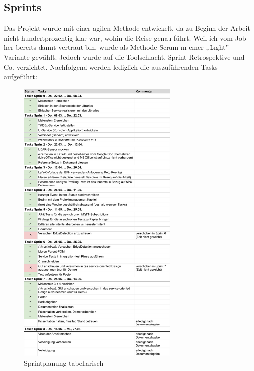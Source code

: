 \subsection{Sprints}
Das Projekt wurde mit einer agilen Methode entwickelt, da zu Beginn der Arbeit nicht hundertprozentig klar war, wohin die Reise genau führt. Weil ich vom Job her bereits damit vertraut bin, wurde als Methode  Scrum in einer ,,Light''-Variante gewählt. Jedoch wurde auf die Toolschlacht, Sprint-Retrospektive und Co. verzichtet. Nachfolgend werden lediglich die auszuführenden Tasks aufgeführt:
\begin{figure}[H]
	\centering
	\includegraphics[width=0.7\textwidth]{img/sprintplanung.pdf}
	\caption{Sprintplanung tabellarisch}
	\label{fig:sprintplanung-tabelle}
\end{figure}

